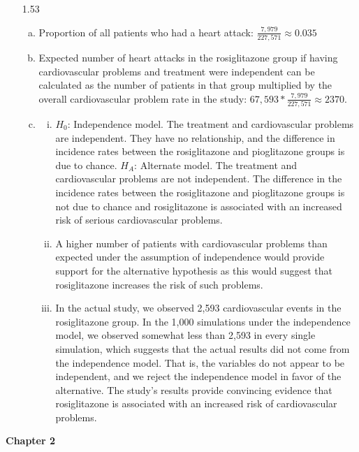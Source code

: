 \documentclass[11pt]{article}
\newenvironment{parts}{
\vspace{-0.25cm}
\begin{enumerate}[(a)]
\setlength{\itemsep}{0mm}
}
{\end{enumerate}
}
\newenvironment{subparts}{
\begin{enumerate}[i.]
\setlength{\itemsep}{0mm}
}
{\end{enumerate}
}
\begin{document}
\begin{enumerate}
\item[1.53]
\begin{parts}
\item Proportion of all patients who had a heart attack: $\frac{7,979}{227,571} \approx 0.035$
\item Expected number of heart attacks in the rosiglitazone group if having cardiovascular problems and treatment were independent can be calculated as the number of patients in that group multiplied by the overall cardiovascular problem rate in the study: $67,593 * \frac{7,979}{227,571} \approx 2370$.
\item 
\begin{subparts}
\item $H_0$: Independence model. The treatment and cardiovascular problems are independent. They have no relationship, and the difference in incidence rates between the rosiglitazone and pioglitazone groups is due to chance.
$H_A$: Alternate model. The treatment and cardiovascular problems are not independent. The difference in the incidence rates between the rosiglitazone and pioglitazone groups is not due to chance and rosiglitazone is associated with an increased risk of serious cardiovascular problems.
\item A higher number of patients with cardiovascular problems than expected under the assumption of independence would provide support for the alternative hypothesis as this would suggest that rosiglitazone increases the risk of such problems.
\item In the actual study, we observed 2,593 cardiovascular events in the rosiglitazone group. In the 1,000 simulations under the independence model, we observed somewhat less than 2,593 in every single simulation, which suggests that the actual results did not come from the independence model. That is, the variables do not appear to be independent, and we reject the independence model in favor of the alternative. The study's results provide convincing evidence that rosiglitazone is associated with an increased risk of cardiovascular problems.
\end{subparts}
\end{parts}

\end{enumerate}

%

{\Large \textcolor{custom_blue}{\textbf{Chapter 2}}}
\end{document}

